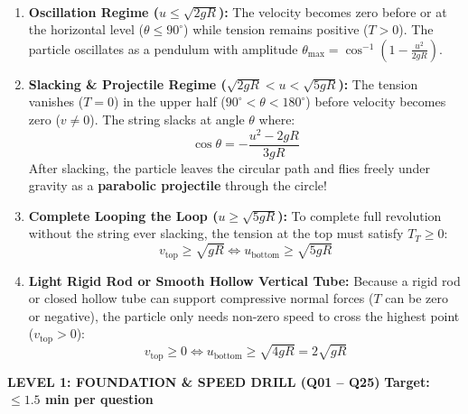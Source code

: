 \documentclass[11pt,a4paper]{article}
\begin{document}
\vspace{5pt}
\noindent{\large\textbf{\textsf{\textcolor{primaryDark}{2.2 Regimes of Motion in a Vertical Circle}}}}\\[3pt]
\begin{enumerate}[label=(\alph*),leftmargin=14pt,itemsep=2.5pt]
  \item \textbf{Oscillation Regime ($u \le \sqrt{2gR}$):}
  The velocity becomes zero before or at the horizontal level ($\theta \le 90^\circ$) while tension remains positive ($T > 0$). The particle oscillates as a pendulum with amplitude $\theta_{\max} = \cos^{-1}\left(1 - \frac{u^2}{2gR}\right)$.
  \item \textbf{Slacking \& Projectile Regime ($\sqrt{2gR} < u < \sqrt{5gR}$):}
  The tension vanishes ($T = 0$) in the upper half ($90^\circ < \theta < 180^\circ$) before velocity becomes zero ($v \ne 0$). The string slacks at angle $\theta$ where:
  \[
    \cos\theta = -\frac{u^2 - 2gR}{3gR}
  \]
  After slacking, the particle leaves the circular path and flies freely under gravity as a \textbf{parabolic projectile} through the circle!
  \item \textbf{Complete Looping the Loop ($u \ge \sqrt{5gR}$):}
  To complete full revolution without the string ever slacking, the tension at the top must satisfy $T_T \ge 0$:
  \[
    v_{\text{top}} \ge \sqrt{gR} \iff u_{\text{bottom}} \ge \sqrt{5gR}
  \]
  \item \textbf{Light Rigid Rod or Smooth Hollow Vertical Tube:}
  Because a rigid rod or closed hollow tube can support compressive normal forces ($T$ can be zero or negative), the particle only needs non-zero speed to cross the highest point ($v_{\text{top}} > 0$):
  \[
    v_{\text{top}} \ge 0 \iff u_{\text{bottom}} \ge \sqrt{4gR} = 2\sqrt{gR}
  \]
\end{enumerate}

\newpage


\begin{tcolorbox}[l1banner]
  {\large \textbf{\textsf{LEVEL 1: FOUNDATION \& SPEED DRILL (Q01 -- Q25)}}} \hfill {\small \textbf{Target: $\le 1.5$ min per question}}
\end{tcolorbox}
\vspace{4pt}
\end{document}
